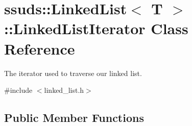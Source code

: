 \hypertarget{classssuds_1_1_linked_list_1_1_linked_list_iterator}{}\section{ssuds\+::Linked\+List$<$ T $>$\+::Linked\+List\+Iterator Class Reference}
\label{classssuds_1_1_linked_list_1_1_linked_list_iterator}


The iterator used to traverse our linked list.  




{\ttfamily \#include $<$linked\+\_\+list.\+h$>$}

\subsection*{Public Member Functions}
